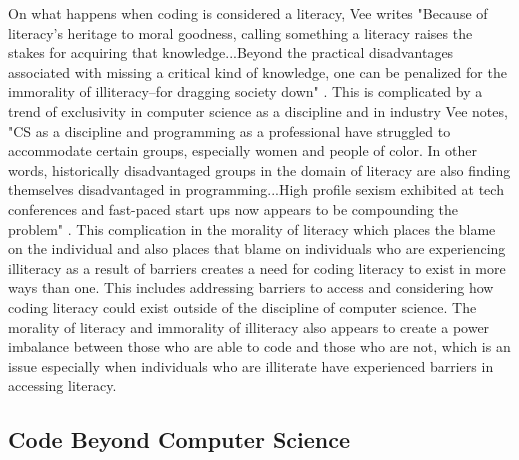 On what happens when coding is considered a literacy, Vee writes "Because of literacy's heritage to moral goodness, calling something a literacy raises the stakes for acquiring that knowledge...Beyond the practical disadvantages associated with missing a critical kind of knowledge, one can be penalized for the immorality of illiteracy--for dragging society down" \cite{vee2017coding}. This is complicated by a trend of exclusivity in computer science as a discipline and in industry Vee notes, "CS as a discipline and programming as a professional have struggled to accommodate certain groups, especially women and people of color. In other words, historically disadvantaged groups in the domain of literacy are also finding themselves disadvantaged in programming...High profile sexism exhibited at tech conferences and fast-paced start ups now appears to be compounding the problem" \cite{vee2017coding}. This complication in the morality of literacy which places the blame on the individual and also places that blame on individuals who are experiencing illiteracy as a result of barriers creates a need for coding literacy to exist in more ways than one. This includes addressing barriers to access and considering how coding literacy could exist outside of the discipline of computer science. The morality of literacy and immorality of illiteracy also appears to create a power imbalance between those who are able to code and those who are not, which is an issue especially when individuals who are illiterate have experienced barriers in accessing literacy. 

\subsection{Code Beyond Computer Science}


